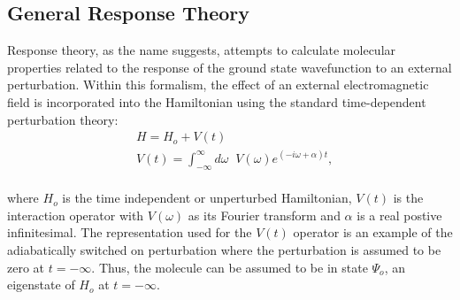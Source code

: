 \subsection{General Response Theory}
Response theory, as the name suggests, attempts to calculate molecular properties related 
to the response of the ground state wavefunction to an external perturbation. Within this 
formalism, the effect of an external electromagnetic field is incorporated into the 
Hamiltonian using the standard time-dependent perturbation theory:
\\
\begin{equation}
\begin{split}
& H = H_o + V(t)\\
&V(t) = \int_{-\infty}^{\infty}d\omega\;\;V(\omega) e^{(-i\omega + \alpha)t},
\end{split}
\end{equation}
\\
where $H_o$ is the time independent or unperturbed Hamiltonian, $V(t)$ is the interaction 
operator with $V(\omega)$ as its Fourier transform and $\alpha$ is a real postive infinitesimal.
The representation used for the $V(t)$ operator is an example of the adiabatically 
switched on perturbation\cite{Koch90} where the perturbation is assumed to be zero at 
$t = -\infty$. Thus, the molecule can be assumed to be in state $\Psi_o$, an 
eigenstate of $H_o$ at $t = -\infty$.
